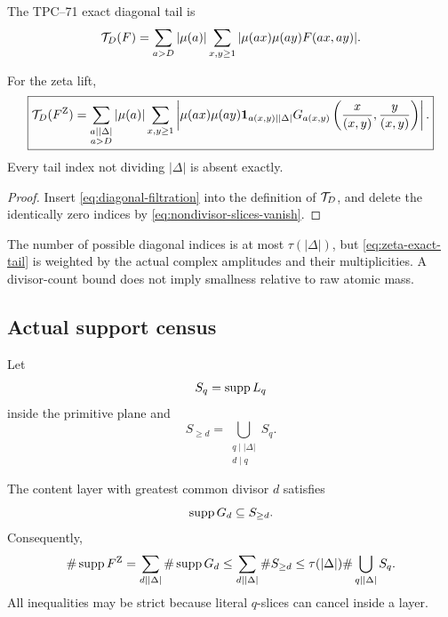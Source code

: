 The TPC--71 exact diagonal tail \citep{WangTPC71} is
\[
 \mathcal T_D(F)
 =
 \sum_{a>D}|\mu(a)|
 \sum_{x,y\ge1}
 |\mu(ax)\mu(ay)F(ax,ay)|.
\]

\begin{corollary}
\label{cor:divisor-supported-tail}
For the zeta lift,
\begin{equation}
 \boxed{
 \mathcal T_D(F^{\rm Z})
 =
 \sum_{\substack{a\mid|\Delta|\\a>D}}|\mu(a)|
 \sum_{x,y\ge1}
 \left|
 \mu(ax)\mu(ay)
 \mathbf 1_{a(x,y)\mid|\Delta|}
 G_{a(x,y)}
 \left(\frac{x}{(x,y)},\frac{y}{(x,y)}\right)
 \right|.}
 \label{eq:zeta-exact-tail}
\end{equation}
Every tail index not dividing \(|\Delta|\) is absent exactly.
\end{corollary}

\begin{proof}
Insert \eqref{eq:diagonal-filtration} into the definition of
\(\mathcal T_D\), and delete the identically zero indices by
\eqref{eq:nondivisor-slices-vanish}.
\end{proof}

\begin{remark}
The number of possible diagonal indices is at most
\(\tau(|\Delta|)\), but \eqref{eq:zeta-exact-tail} is weighted by the
actual complex amplitudes and their multiplicities.  A divisor-count
bound does not imply smallness relative to raw atomic mass.
\end{remark}

\subsection{Actual support census}

Let
\[
 S_q=\operatorname{supp} L_q
\]
inside the primitive plane and
\[
 S_{\ge d}=\bigcup_{\substack{q\mid|\Delta|\\d\mid q}}S_q.
\]

\begin{proposition}
\label{prop:layered-support}
The content layer with greatest common divisor \(d\) satisfies
\[
 \operatorname{supp} G_d\subseteq S_{\ge d}.
\]
Consequently,
\begin{equation}
 \#\operatorname{supp} F^{\rm Z}
 =
 \sum_{d\mid|\Delta|}\#\operatorname{supp} G_d
 \le
 \sum_{d\mid|\Delta|}\#S_{\ge d}
 \le
 \tau(|\Delta|)
 \#\bigcup_{q\mid|\Delta|}S_q.
 \label{eq:support-census}
\end{equation}
All inequalities may be strict because literal \(q\)-slices can cancel
inside a layer.
\end{proposition}

